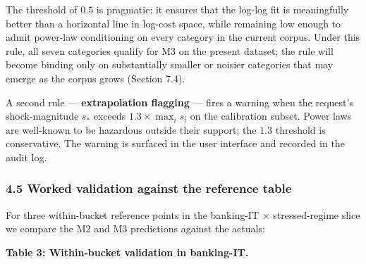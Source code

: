 \documentclass[
]{article}
\begin{document}
The threshold of \(0.5\) is pragmatic: it ensures that the log-log fit
is meaningfully better than a horizontal line in log-cost space, while
remaining low enough to admit power-law conditioning on every category
in the current corpus. Under this rule, all seven categories qualify for
M3 on the present dataset; the rule will become binding only on
substantially smaller or noisier categories that may emerge as the
corpus grows (Section 7.4).

A second rule --- \textbf{extrapolation flagging} --- fires a warning
when the request's shock-magnitude \(s_*\) exceeds
\(1.3 \times \max_i s_i\) on the calibration subset. Power laws are
well-known to be hazardous outside their support; the \(1.3\) threshold
is conservative. The warning is surfaced in the user interface and
recorded in the audit log.

\subsubsection{4.5 Worked validation against the reference
table}\label{worked-validation-against-the-reference-table}

For three within-bucket reference points in the banking-IT ×
stressed-regime slice we compare the M2 and M3 predictions against the
actuals:

\textbf{Table 3: Within-bucket validation in banking-IT.}
\end{document}
